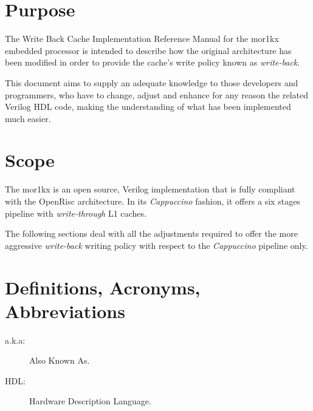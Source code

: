 \section{Purpose}
The Write Back Cache Implementation Reference Manual for the mor1kx embedded processor is intended to describe how the original architecture has been modified in order to provide the cache's write policy known as \textit{write-back}.

This document aims to supply an adequate knowledge to those developers and programmers, who have to change, adjust and enhance for any reason the related Verilog HDL code, making the understanding of what has been implemented much easier.

\section{Scope}
The mor1kx is an open source, Verilog implementation that is fully compliant with the OpenRisc architecture. In its \textit{Cappuccino} fashion, it offers a six stages pipeline with \textit{write-through} L1 caches.

The following sections deal with all the adjustments required to offer the more aggressive \textit{write-back} writing policy with respect to the \textit{Cappuccino} pipeline only.

\section{Definitions, Acronyms, Abbreviations}
\begin{description}
	\item[a.k.a:] Also Known As.
	\item[HDL:] Hardware Description Language.
\end{description}